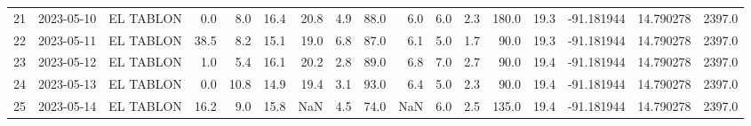 \documentclass[12pt]{article}
\begin{document}
\begin{center}
\begin{tabular}{lllrrrrrrrrrrrrrr}
21  & 2023-05-10 &  EL TABLON &     0.0 &   8.0 &   16.4 &  20.8 &      4.9 &     88.0 &        6.0 &  6.0 &         2.3 &       180.0 &        19.3 & -91.181944 &  14.790278 &   2397.0 \\
22  & 2023-05-11 &  EL TABLON &    38.5 &   8.2 &   15.1 &  19.0 &      6.8 &     87.0 &        6.1 &  5.0 &         1.7 &        90.0 &        19.3 & -91.181944 &  14.790278 &   2397.0 \\
23  & 2023-05-12 &  EL TABLON &     1.0 &   5.4 &   16.1 &  20.2 &      2.8 &     89.0 &        6.8 &  7.0 &         2.7 &        90.0 &        19.4 & -91.181944 &  14.790278 &   2397.0 \\
24  & 2023-05-13 &  EL TABLON &     0.0 &  10.8 &   14.9 &  19.4 &      3.1 &     93.0 &        6.4 &  5.0 &         2.3 &        90.0 &        19.4 & -91.181944 &  14.790278 &   2397.0 \\
25  & 2023-05-14 &  EL TABLON &    16.2 &   9.0 &   15.8 &   NaN &      4.5 &     74.0 &        NaN &  6.0 &         2.5 &       135.0 &        19.4 & -91.181944 &  14.790278 &   2397.0 \\
\bottomrule
\end{tabular}

        
        \end{center}
        
\end{document}
